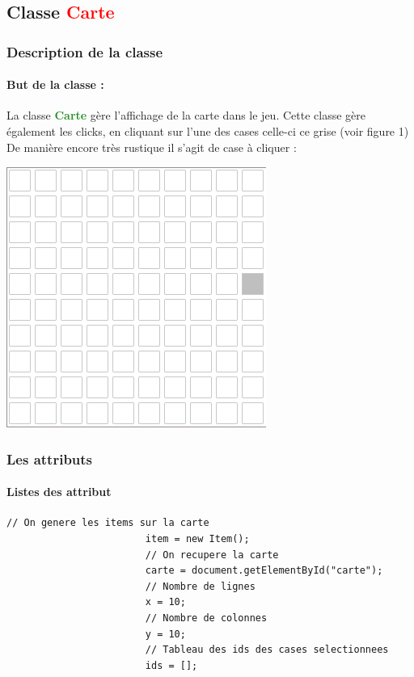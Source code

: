 \documentclass[12pt,a4paper]{report}
\begin{document}
   	 	\subsection{Classe \textcolor{red}{Carte}}
   	 		\subsubsection{Description de la classe}
   	 			\paragraph{But de la classe : }
   	 				La classe \textbf{\textcolor{ForestGreen}{Carte}} gère l'affichage de la carte dans le jeu. Cette classe gère également les clicks, en cliquant sur l'une des cases celle-ci ce grise (voir figure 1)
   	 				De manière encore très rustique il s'agit de case à cliquer : \newline
   	 				\begin{center}
						\includegraphics[scale=1]{img/carte.png}
   	 				\end{center}


   	 		\subsubsection{Les attributs}
   	 			\paragraph{Listes des attribut}
					\begin{lstlisting}[caption={Attributs classe Carte}]
						// On genere les items sur la carte 
						item = new Item(); 
						// On recupere la carte 
						carte = document.getElementById("carte"); 
						// Nombre de lignes
						x = 10; 
						// Nombre de colonnes
						y = 10; 
						// Tableau des ids des cases selectionnees
						ids = []; 
					\end{lstlisting}
\end{document}
